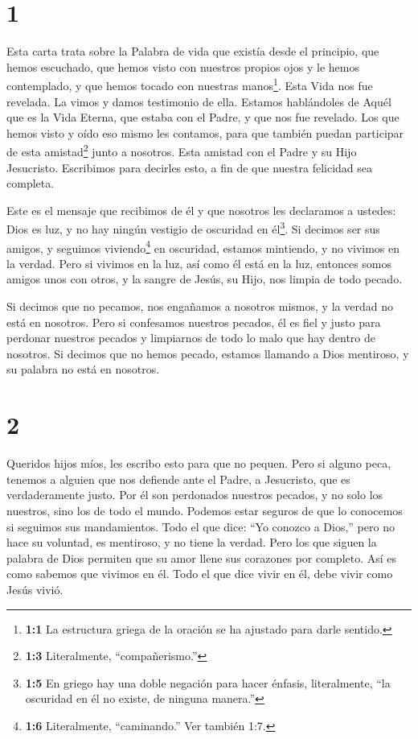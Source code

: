 \hypertarget{section}{%
\section{1}\label{section}}

 Esta carta trata sobre la Palabra de vida que existía desde
el principio, que hemos escuchado, que hemos visto con nuestros propios
ojos y le hemos contemplado, y que hemos tocado con nuestras
manos\footnote{\textbf{1:1} La estructura griega de la oración se ha
  ajustado para darle sentido.}.  Esta Vida nos fue
revelada. La vimos y damos testimonio de ella. Estamos hablándoles de
Aquél que es la Vida Eterna, que estaba con el Padre, y que nos fue
revelado.  Los que hemos visto y oído eso mismo les
contamos, para que también puedan participar de esta amistad\footnote{\textbf{1:3}
  Literalmente, ``compañerismo.''} junto a nosotros. Esta amistad con el
Padre y su Hijo Jesucristo.  Escribimos para decirles esto,
a fin de que nuestra felicidad sea completa.

 Este es el mensaje que recibimos de él y que nosotros les
declaramos a ustedes: Dios es luz, y no hay ningún vestigio de oscuridad
en él\footnote{\textbf{1:5} En griego hay una doble negación para hacer
  énfasis, literalmente, ``la oscuridad en él no existe, de ninguna
  manera.''}.  Si decimos ser sus amigos, y seguimos
viviendo\footnote{\textbf{1:6} Literalmente, ``caminando.'' Ver también
  1:7.} en oscuridad, estamos mintiendo, y no vivimos en la verdad.
 Pero si vivimos en la luz, así como él está en la luz,
entonces somos amigos unos con otros, y la sangre de Jesús, su Hijo, nos
limpia de todo pecado.

 Si decimos que no pecamos, nos engañamos a nosotros mismos,
y la verdad no está en nosotros.  Pero si confesamos
nuestros pecados, él es fiel y justo para perdonar nuestros pecados y
limpiarnos de todo lo malo que hay dentro de nosotros.  Si
decimos que no hemos pecado, estamos llamando a Dios mentiroso, y su
palabra no está en nosotros.

\hypertarget{section-1}{%
\section{2}\label{section-1}}

 Queridos hijos míos, les escribo esto para que no pequen.
Pero si alguno peca, tenemos a alguien que nos defiende ante el Padre, a
Jesucristo, que es verdaderamente justo.  Por él son
perdonados nuestros pecados, y no solo los nuestros, sino los de todo el
mundo.  Podemos estar seguros de que lo conocemos si
seguimos sus mandamientos.  Todo el que dice: ``Yo conozco a
Dios,'' pero no hace su voluntad, es mentiroso, y no tiene la verdad.
 Pero los que siguen la palabra de Dios permiten que su amor
llene sus corazones por completo. Así es como sabemos que vivimos en él.
 Todo el que dice vivir en él, debe vivir como Jesús vivió.


